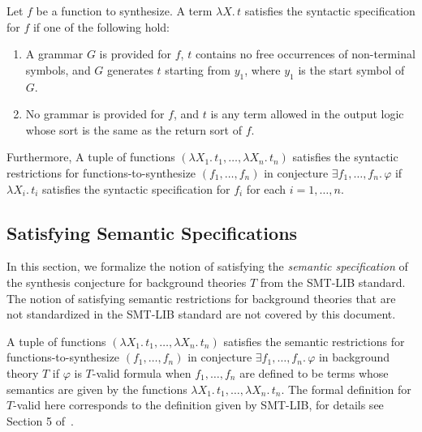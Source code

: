 \documentclass[english,a4paper,10pt]{article}
\begin{document}
Let $f$ be a function to synthesize.
A term $\lambda X.\, t$
satisfies the syntactic specification for $f$
if one of the following hold:
\begin{enumerate}
\item 
A grammar $G$ is provided for $f$,
$t$ contains no free occurrences of non-terminal symbols,
and $G$ generates $t$ starting from $y_1$,
where $y_1$ is the start symbol of $G$.

\item
No grammar is provided for $f$, and $t$ is any
term allowed in the output logic whose sort
is the same as the return sort of $f$.
\end{enumerate}

Furthermore,
A tuple of functions 
$( \lambda X_1.\, t_1, \ldots, \lambda X_n.\, t_n )$
satisfies the syntactic restrictions
for functions-to-synthesize $( f_1, \ldots, f_n )$
in conjecture $\exists f_1, \ldots, f_n.\, \varphi$
if $\lambda X_i.\, t_i$
satisfies the syntactic specification for $f_i$
for each $i=1,\ldots,n$.

\subsection{Satisfying Semantic Specifications}
\label{ssec:sat-semantic}

In this section,
we formalize the notion of satisfying the \emph{semantic specification}
of the synthesis conjecture
for background theories $T$ from the SMT-LIB standard.
The notion of satisfying semantic restrictions for background theories
that are not standardized in the SMT-LIB standard are not covered by this document.

A tuple of functions 
$( \lambda X_1.\, t_1, \ldots, \lambda X_n.\, t_n)$
satisfies the semantic restrictions
for functions-to-synthesize $( f_1, \ldots, f_n )$
in conjecture $\exists f_1, \ldots, f_n.\,  \varphi$ in background theory $T$
if $\varphi$ is $T$-valid formula
when $f_1, \ldots, f_n$ are defined to be terms
whose semantics are given by the functions
$\lambda X_1.\, t_1, \ldots, \lambda X_n.\, t_n$.
The formal definition for $T$-valid here
corresponds to the definition given by SMT-LIB,
for details see Section 5 of~\cite{BarFT-RR-17}.
\end{document}

